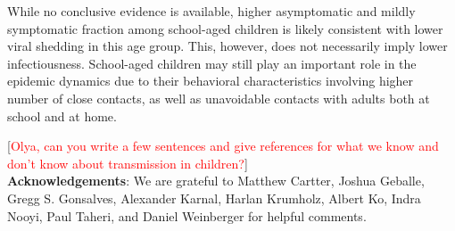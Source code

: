 \documentclass[11pt]{article}
\newcommand{\comment}[1]{[\textcolor{red}{#1}]}
\begin{document}
While no conclusive evidence is available, higher asymptomatic and mildly symptomatic fraction among school-aged children is likely consistent with lower viral shedding in this age group. This, however, does not necessarily imply lower infectiousness. School-aged children may still play an important role in the epidemic dynamics due to their behavioral characteristics involving higher number of close contacts, as well as unavoidable contacts with adults both at school and at home. 


\comment{Olya, can you write a few sentences and give references for what we know and don't know about transmission in children?} \\
\comment{I have not seen studies looking at this issue. If we have time, I will look later. I added a sentence highlighting that low viral shedding does not equal low infectiousness if we factor in contact frequency and types of contacts, as well as the fact that children can't be isolated (they live with parents, while many adults live alone).}




\textbf{Acknowledgements}: We are grateful to
Matthew Cartter,
Joshua Geballe,
Gregg S. Gonsalves,
Alexander Karnal,
Harlan Krumholz,
Albert Ko, 
Indra Nooyi,
Paul Taheri, 
and
Daniel Weinberger
for helpful comments. 





\end{document}
